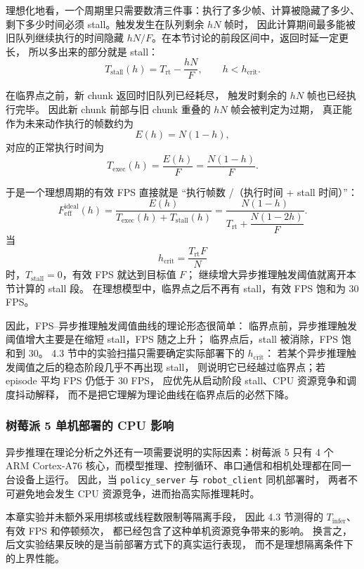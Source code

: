 理想化地看，一个周期里只需要数清三件事：执行了多少帧、计算被隐藏了多少、
剩下多少时间必须 stall。触发发生在队列剩余 $hN$ 帧时，
因此计算期间最多能被旧队列继续执行的时间隐藏
$hN/F$。在本节讨论的前段区间中，返回时延一定更长，
所以多出来的部分就是 stall：
\begin{equation}
  T_{\text{stall}}(h)
  =
  T_{\text{rt}}-\frac{hN}{F},
  \qquad h<h_{\text{crit}}.
\end{equation}

在临界点之前，新 chunk 返回时旧队列已经耗尽，
触发时剩余的 $hN$ 帧也已经执行完毕。
因此新 chunk 前部与旧 chunk 重叠的 $hN$ 帧会被判定为过期，
真正能作为未来动作执行的帧数约为
\begin{equation}
  E(h) = N(1-h),
\end{equation}
对应的正常执行时间为
\begin{equation}
  T_{\text{exec}}(h) = \frac{E(h)}{F}
  = \frac{N(1-h)}{F}.
\end{equation}

于是一个理想周期的有效 FPS 直接就是
``执行帧数 /（执行时间 + stall 时间）''：
\begin{equation}
  F_{\text{eff}}^{\text{ideal}}(h)
  =
  \frac{E(h)}{T_{\text{exec}}(h)+T_{\text{stall}}(h)}
  =
  \frac{N(1-h)}
       {T_{\text{rt}}+\dfrac{N(1-2h)}{F}}.
\end{equation}
当
\begin{equation}
  h_{\text{crit}} = \frac{T_{\text{rt}}F}{N}
\end{equation}
时，$T_{\text{stall}}=0$，有效 FPS 就达到目标值 $F$；
继续增大异步推理触发阈值就离开本节计算的 stall 段。
在理想模型中，临界点之后不再有 stall，有效 FPS 饱和为 30 FPS。

因此，FPS--异步推理触发阈值曲线的理论形态很简单：
临界点前，异步推理触发阈值增大主要是在缩短 stall，FPS 随之上升；
临界点后，stall 被消除，FPS 饱和到 30。
4.3 节中的实验扫描只需要确定实际部署下的 $h_{\text{crit}}$：
若某个异步推理触发阈值之后的稳态阶段几乎不再出现 stall，
则说明它已经越过临界点；若 episode 平均 FPS 仍低于 30 FPS，
应优先从启动阶段 stall、CPU 资源竞争和调度抖动解释，
而不是把它理解为理论曲线在临界点后的必然下降。

\subsubsection{树莓派 5 单机部署的 CPU 影响}\label{sec:async-inf-cpu-contention}

异步推理在理论分析之外还有一项需要说明的实际因素：树莓派 5 只有 4 个
ARM Cortex-A76 核心，而模型推理、控制循环、串口通信和相机处理都在同一台设备上运行。
因此，当 \texttt{policy\_server} 与 \texttt{robot\_client} 同机部署时，
两者不可避免地会发生 CPU 资源竞争，进而抬高实际推理耗时。

本章实验并未额外采用绑核或线程数限制等隔离手段，
因此 4.3 节测得的 $T_{\text{infer}}$、有效 FPS 和停顿频次，
都已经包含了这种单机资源竞争带来的影响。
换言之，后文实验结果反映的是当前部署方式下的真实运行表现，
而不是理想隔离条件下的上界性能。
